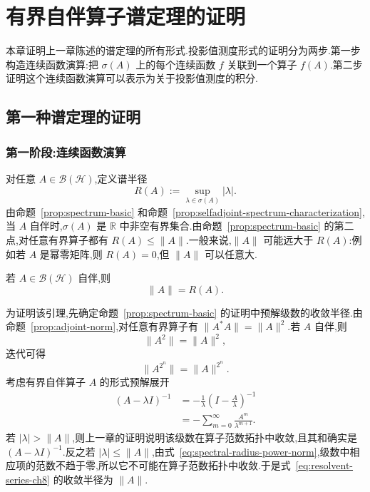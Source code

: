 \chapter{有界自伴算子谱定理的证明}
\label{chap:bounded-spectral-proofs}

本章证明上一章陈述的谱定理的所有形式.投影值测度形式的证明分为两步.第一步构造连续函数演算:把 \(\sigma(A)\) 上的每个连续函数 \(f\) 关联到一个算子 \(f(A)\).第二步证明这个连续函数演算可以表示为关于投影值测度的积分.

\section{第一种谱定理的证明}
\label{sec:proof-spectral-first}

\subsection{第一阶段:连续函数演算}
\label{subsec:continuous-functional-calculus-proof}

对任意 \(A\in\mathcal{B}(\mathcal{H})\),定义谱半径
\[
R(A):=\sup_{\lambda\in\sigma(A)}|\lambda|.
\]
由命题~\ref{prop:spectrum-basic} 和命题~\ref{prop:selfadjoint-spectrum-characterization},当 \(A\) 自伴时,\(\sigma(A)\) 是 \(\mathbb{R}\) 中非空有界集合.由命题~\ref{prop:spectrum-basic} 的第二点,对任意有界算子都有 \(R(A)\leq\|A\|\).一般来说,\(\|A\|\) 可能远大于 \(R(A)\):例如若 \(A\) 是幂零矩阵,则 \(R(A)=0\),但 \(\|A\|\) 可以任意大.

\begin{lemma}[自伴算子的谱半径]\label{lem:selfadjoint-spectral-radius}
若 \(A\in\mathcal{B}(\mathcal{H})\) 自伴,则
\[
\|A\|=R(A).
\]
\end{lemma}

为证明该引理,先确定命题~\ref{prop:spectrum-basic} 的证明中预解级数的收敛半径.由命题~\ref{prop:adjoint-norm},对任意有界算子有 \(\|A^{*}A\|=\|A\|^{2}\).若 \(A\) 自伴,则
\[
\|A^{2}\|=\|A\|^{2},
\]
迭代可得
\[
\|A^{2^{n}}\|=\|A\|^{2^{n}}.
\label{eq:spectral-radius-power-norm}
\]
考虑有界自伴算子 \(A\) 的形式预解展开
\[
\begin{aligned}
(A-\lambda I)^{-1}
&=-\frac{1}{\lambda}\left(I-\frac{A}{\lambda}\right)^{-1}\\
&=-\sum_{m=0}^{\infty}\frac{A^{m}}{\lambda^{m+1}}.
\end{aligned}
\label{eq:resolvent-series-ch8}
\]
若 \(|\lambda|>\|A\|\),则上一章的证明说明该级数在算子范数拓扑中收敛,且其和确实是 \((A-\lambda I)^{-1}\).反之若 \(|\lambda|\leq\|A\|\),由式~\eqref{eq:spectral-radius-power-norm},级数中相应项的范数不趋于零,所以它不可能在算子范数拓扑中收敛.于是式~\eqref{eq:resolvent-series-ch8} 的收敛半径为 \(\|A\|\).

